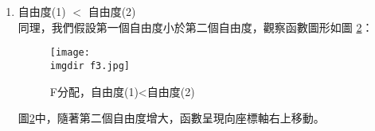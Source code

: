 \begin{enumerate}
{\begin{enumerate}
{\begin{figure}[H]
   				 				\texttt{[image: \\imgdir f2.jpg]} 
   			 					\caption{F分配，自由度(1)=自由度(2)}   		
   			 					\label{f2}   			 		 
							\end{figure}
							圖\ref{f2}可以明顯看出，函數圖形明顯趨於集中，且圖形分布逐漸向座標								軸右邊移動。
						}
						\item{自由度(1) $<$ 自由度(2)\\
							同理，我們假設第一個自由度小於第二個自由度，觀察函數圖形如圖										\ref{f3}：
							\begin{figure}[H]	
		 		 				\centering	 			 	 
   				 				\texttt{[image: \\imgdir f3.jpg]} 
   			 					\caption{F分配，自由度(1)<自由度(2)}   		
   			 					\label{f3}   			 		 
							\end{figure}
							圖\ref{f3}中，隨著第二個自由度增大，函數呈現向座標軸右上移動。		
						}						
					\end{enumerate}
					
}
\end{enumerate}
